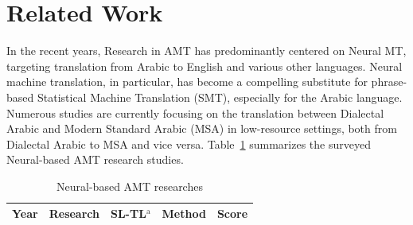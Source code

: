 \section{Related Work}
In the recent years, Research in AMT has predominantly centered on Neural MT, targeting translation from Arabic to English and various other languages. 
Neural machine translation, in particular, has become a compelling substitute for phrase-based Statistical Machine Translation (SMT), especially for the Arabic language.
Numerous studies are currently focusing on the translation between Dialectal Arabic and Modern Standard Arabic (MSA) in low-resource settings, both from Dialectal Arabic to MSA and vice versa.
Table~\ref{tab_ANMT} summarizes the surveyed Neural-based AMT research studies.
\begin{small}
	\begin{longtable}{|l|l|l|l|l|}
		\caption{Neural-based AMT researches}
		\label{tab_ANMT}\\
		\hline
		Year & Research & SL-TL$^{\mathrm{a}}$ & Method & Score\\
		\hline
		\endhead
		

\end{longtable}
\end{small}
